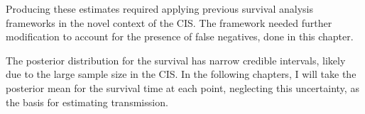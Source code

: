 \documentclass[thesis.tex]{subfiles}
\begin{document}
Producing these estimates required applying previous survival analysis frameworks in the novel context of the CIS.
The framework needed further modification to account for the presence of false negatives, done in this chapter.

The posterior distribution for the survival has narrow credible intervals, likely due to the large sample size in the CIS.
In the following chapters, I will take the posterior mean for the survival time at each point, neglecting this uncertainty, as the basis for estimating transmission.

\ifSubfilesClassLoaded{
  \listoftodos
}{}
\end{document}
